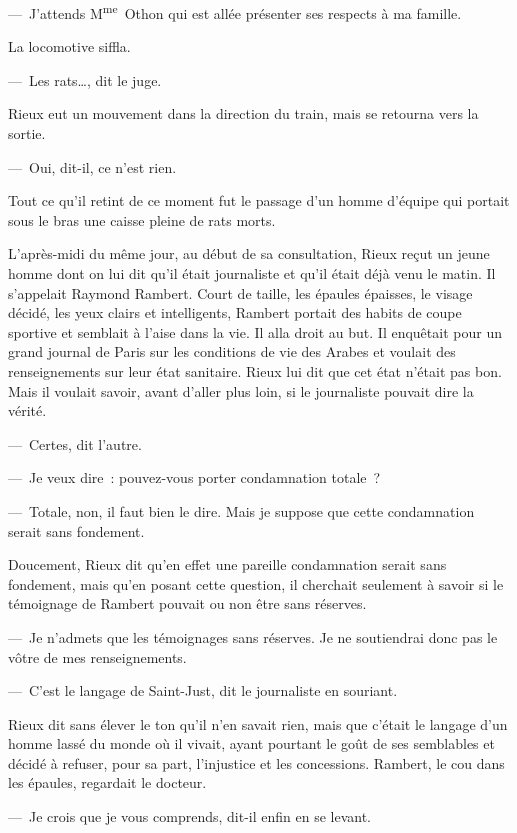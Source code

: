 \documentclass[french,twoside]{book} %
\begin{document}
— J’attends M\textsuperscript{me} Othon qui est allée présenter ses respects à ma famille.\par
La locomotive siffla.\par
— Les rats…, dit le juge.\par
Rieux eut un mouvement dans la direction du train, mais se retourna vers la sortie.\par
— Oui, dit-il, ce n’est rien.\par
Tout ce qu’il retint de ce moment fut le passage d’un homme d’équipe qui portait sous le bras une caisse pleine de rats morts.\par
L’après-midi du même jour, au début de sa consultation, Rieux reçut un jeune homme dont on lui dit qu’il était journaliste et qu’il était déjà venu le matin. Il s’appelait Raymond Rambert. Court de taille, les épaules épaisses, le visage décidé, les yeux clairs et intelligents, Rambert portait des habits de coupe sportive et semblait à l’aise dans la vie. Il alla droit au but. Il enquêtait pour un grand journal de Paris sur les conditions de vie des Arabes et voulait des renseignements sur leur état sanitaire. Rieux lui dit que cet état n’était pas bon. Mais il voulait savoir, avant d’aller plus loin, si le journaliste pouvait dire la vérité.\par
— Certes, dit l’autre.\par
— Je veux dire : pouvez-vous porter condamnation totale ?\par
— Totale, non, il faut bien le dire. Mais je suppose que cette condamnation serait sans fondement.\par
Doucement, Rieux dit qu’en effet une pareille condamnation serait sans fondement, mais qu’en posant cette question, il cherchait seulement à savoir si le témoignage de Rambert pouvait ou non être sans réserves.\par
— Je n’admets que les témoignages sans réserves. Je ne soutiendrai donc pas le vôtre de mes renseignements.\par
— C’est le langage de Saint-Just, dit le journaliste en souriant.\par
Rieux dit sans élever le ton qu’il n’en savait rien, mais que c’était le langage d’un homme lassé du monde où il vivait, ayant pourtant le goût de ses semblables et décidé à refuser, pour sa part, l’injustice et les concessions. Rambert, le cou dans les épaules, regardait le docteur.\par
— Je crois que je vous comprends, dit-il enfin en se levant.\par
\end{document}

